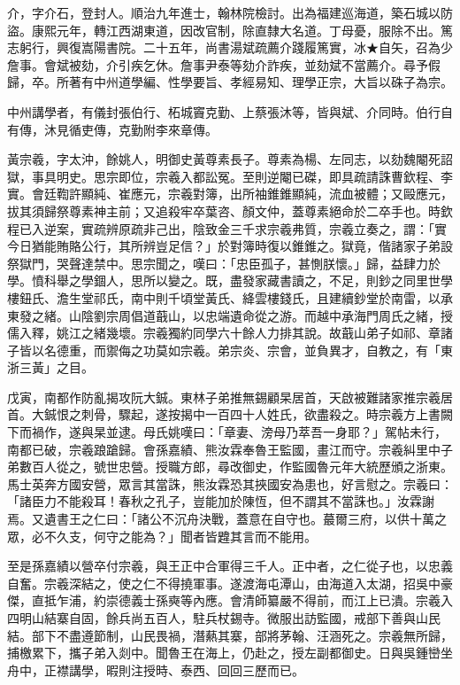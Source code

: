 \begin{pinyinscope}
介，字介石，登封人。順治九年進士，翰林院檢討。出為福建巡海道，築石城以防盜。康熙元年，轉江西湖東道，因改官制，除直隸大名道。丁母憂，服除不出。篤志躬行，興復嵩陽書院。二十五年，尚書湯斌疏薦介踐履篤實，冰★自矢，召為少詹事。會斌被劾，介引疾乞休。詹事尹泰等劾介詐疾，並劾斌不當薦介。尋予假歸，卒。所著有中州道學編、性學要旨、孝經易知、理學正宗，大旨以硃子為宗。

中州講學者，有儀封張伯行、柘城竇克勤、上蔡張沐等，皆與斌、介同時。伯行自有傳，沐見循吏傳，克勤附李來章傳。

黃宗羲，字太沖，餘姚人，明御史黃尊素長子。尊素為楊、左同志，以劾魏閹死詔獄，事具明史。思宗即位，宗羲入都訟冤。至則逆閹已磔，即具疏請誅曹欽程、李實。會廷鞫許顯純、崔應元，宗羲對簿，出所袖錐錐顯純，流血被體；又毆應元，拔其須歸祭尊素神主前；又追殺牢卒葉咨、顏文仲，蓋尊素絕命於二卒手也。時欽程已入逆案，實疏辨原疏非己出，陰致金三千求宗羲弗質，宗羲立奏之，謂：「實今日猶能賄賂公行，其所辨豈足信？」於對簿時復以錐錐之。獄竟，偕諸家子弟設祭獄門，哭聲達禁中。思宗聞之，嘆曰：「忠臣孤子，甚惻朕懷。」歸，益肆力於學。憤科舉之學錮人，思所以變之。既，盡發家藏書讀之，不足，則鈔之同里世學樓鈕氏、澹生堂祁氏，南中則千頃堂黃氏、絳雲樓錢氏，且建續鈔堂於南雷，以承東發之緒。山陰劉宗周倡道蕺山，以忠端遺命從之游。而越中承海門周氏之緒，授儒入釋，姚江之緒幾壞。宗羲獨約同學六十餘人力排其說。故蕺山弟子如祁、章諸子皆以名德重，而禦侮之功莫如宗羲。弟宗炎、宗會，並負異才，自教之，有「東浙三黃」之目。

戊寅，南都作防亂揭攻阮大鋮。東林子弟推無錫顧杲居首，天啟被難諸家推宗羲居首。大鋮恨之刺骨，驟起，遂按揭中一百四十人姓氏，欲盡殺之。時宗羲方上書闕下而禍作，遂與杲並逮。母氏姚嘆曰：「章妻、滂母乃萃吾一身耶？」駕帖未行，南都已破，宗羲踉蹌歸。會孫嘉績、熊汝霖奉魯王監國，畫江而守。宗羲糾里中子弟數百人從之，號世忠營。授職方郎，尋改御史，作監國魯元年大統歷頒之浙東。馬士英奔方國安營，眾言其當誅，熊汝霖恐其挾國安為患也，好言慰之。宗羲曰：「諸臣力不能殺耳！春秋之孔子，豈能加於陳恆，但不謂其不當誅也。」汝霖謝焉。又遺書王之仁曰：「諸公不沉舟決戰，蓋意在自守也。蕞爾三府，以供十萬之眾，必不久支，何守之能為？」聞者皆韙其言而不能用。

至是孫嘉績以營卒付宗羲，與王正中合軍得三千人。正中者，之仁從子也，以忠義自奮。宗羲深結之，使之仁不得撓軍事。遂渡海屯潭山，由海道入太湖，招吳中豪傑，直抵乍浦，約崇德義士孫奭等內應。會清師纂嚴不得前，而江上已潰。宗羲入四明山結寨自固，餘兵尚五百人，駐兵杖錫寺。微服出訪監國，戒部下善與山民結。部下不盡遵節制，山民畏禍，潛爇其寨，部將茅翰、汪涵死之。宗羲無所歸，捕檄累下，攜子弟入剡中。聞魯王在海上，仍赴之，授左副都御史。日與吳鍾巒坐舟中，正襟講學，暇則注授時、泰西、回回三歷而已。


\end{pinyinscope}
